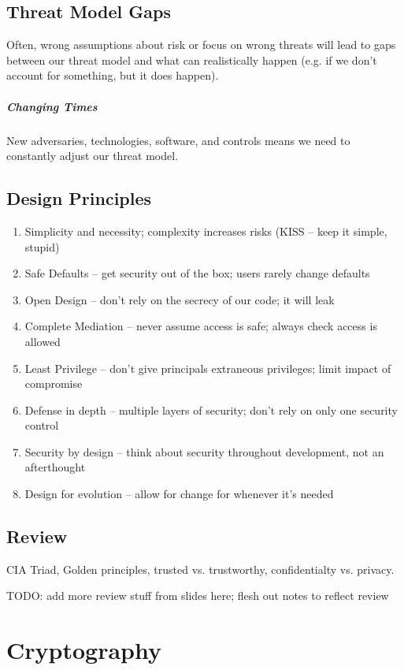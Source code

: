 \documentclass[12pt]{report}
\begin{document}
\section{Threat Model Gaps}
Often, wrong assumptions about risk or focus on wrong threats will lead to gaps between our threat model and what can realistically happen (e.g. if we don't account for something, but it does happen).

\paragraph{Changing Times}
New adversaries, technologies, software, and controls means we need to constantly adjust our threat model.

\section{Design Principles}
\begin{enumerate}
    \item Simplicity and necessity; complexity increases risks (KISS -- keep it simple, stupid)
    \item Safe Defaults -- get security out of the box; users rarely change defaults
    \item Open Design -- don't rely on the secrecy of our code; it will leak
    \item Complete Mediation -- never assume access is safe; always check access is allowed
    \item Least Privilege -- don't give principals extraneous privileges; limit impact of compromise
    \item Defense in depth -- multiple layers of security; don't rely on only one security control
    \item Security by design -- think about security throughout development, not an afterthought
    \item Design for evolution -- allow for change for whenever it's needed
\end{enumerate}

\section{Review}
CIA Triad, Golden principles, trusted vs. trustworthy, confidentialty vs. privacy.

TODO: add more review stuff from slides here; flesh out notes to reflect review

\chapter{Cryptography}
\end{document}
